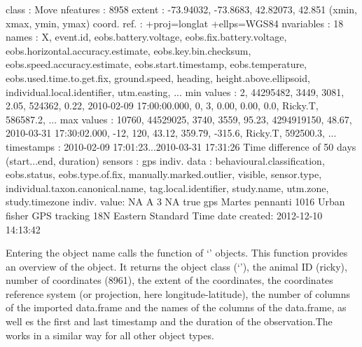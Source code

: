 \documentclass[article,nojss]{jss}
\newcommand{\fct}[1]{{\code{#1()}}}
\newcommand{\class}[1]{{`\code{#1}'}}
\begin{document}
\begin{Schunk}
\begin{Soutput}
class       : Move 
nfeatures   : 8958 
extent      : -73.94032, -73.8683, 42.82073, 42.851  (xmin, xmax, ymin, ymax)
coord. ref. : +proj=longlat +ellps=WGS84 
nvariables  : 18
names       :     X, event.id, eobs.battery.voltage, eobs.fix.battery.voltage, eobs.horizontal.accuracy.estimate, eobs.key.bin.checksum, eobs.speed.accuracy.estimate,    eobs.start.timestamp, eobs.temperature, eobs.used.time.to.get.fix, ground.speed, heading, height.above.ellipsoid, individual.local.identifier, utm.easting, ... 
min values  :     2, 44295482,                 3449,                     3081,                              2.05,                524362,                         0.22, 2010-02-09 17:00:00.000,                0,                         3,         0.00,    0.00,                    0.0,                     Ricky.T,    586587.2, ... 
max values  : 10760, 44529025,                 3740,                     3559,                             95.23,            4294919150,                        48.67, 2010-03-31 17:30:02.000,              -12,                       120,        43.12,  359.79,                 -315.6,                     Ricky.T,    592500.3, ... 
timestamps  : 2010-02-09 17:01:23...2010-03-31 17:31:26 Time difference of 50 days  (start...end, duration) 
sensors     : gps 
indiv. data : behavioural.classification, eobs.status, eobs.type.of.fix, manually.marked.outlier, visible, sensor.type, individual.taxon.canonical.name, tag.local.identifier, study.name, utm.zone, study.timezone 
indiv. value: NA A 3 NA true gps Martes pennanti 1016 Urban fisher GPS tracking 18N Eastern Standard Time 
date created: 2012-12-10 14:13:42 
\end{Soutput}
\end{Schunk}

Entering the object name calls the \fct{show} function of \class{Move} objects. This function provides an overview of the object. It returns the object class (\class{Move}), the animal ID (ricky), number of coordinates (8961), the extent of the coordinates, the coordinates reference system (or projection, here longitude-latitude), the number of columns of the imported data.frame and the names of the columns of the data.frame, as well es the first and last timestamp and the duration of the observation.The \fct{show} works in a similar way for all other object types.\\
\end{document}
